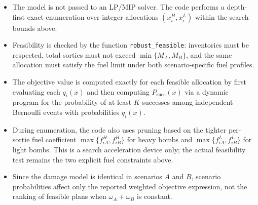 \begin{itemize}
    \item The model is not passed to an LP/MIP solver. The code performs a depth-first exact enumeration over integer allocations $(x_i^H,x_i^L)$ within the search bounds above.
    \item Feasibility is checked by the function \texttt{robust\_feasible}: inventories must be respected, total sorties must not exceed $\min\{M_A,M_B\}$, and the same allocation must satisfy the fuel limit under both scenario-specific fuel profiles.
    \item The objective value is computed exactly for each feasible allocation by first evaluating each $q_i(x)$ and then computing $P_{\mathrm{succ}}(x)$ via a dynamic program for the probability of at least $K$ successes among independent Bernoulli events with probabilities $q_i(x)$.
    \item During enumeration, the code also uses pruning based on the tighter per-sortie fuel coefficient $\max\{f_{iA}^H,f_{iB}^H\}$ for heavy bombs and $\max\{f_{iA}^L,f_{iB}^L\}$ for light bombs. This is a search acceleration device only; the actual feasibility test remains the two explicit fuel constraints above.
    \item Since the damage model is identical in scenarios $A$ and $B$, scenario probabilities affect only the reported weighted objective expression, not the ranking of feasible plans when $\omega_A+\omega_B$ is constant.
\end{itemize}
